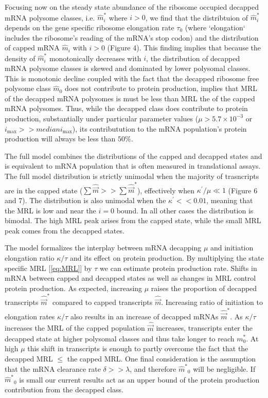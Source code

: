\documentclass[review]{elsarticle}
\newcommand{\imax}{\ensuremath{{i_{\max}}}\xspace}
\newcommand{\kappaprime}{\ensuremath{\kappa^{\prime}}\xspace}
\newcommand{\mhat}{\ensuremath{\hat{m}}\xspace}
\newcommand{\mhatstar}{\ensuremath{\mhat^{*}}\xspace}
\newcommand{\mvec}{\ensuremath{\vec{m}}\xspace}
\newcommand{\mvechat}{\ensuremath{\hat{\mvec}}\xspace}
\newcommand{\mvechatstar}{\ensuremath{\mvechat^*}\xspace}
\begin{document}
Focusing now on the steady state abundance of the ribosome occupied decapped mRNA polysome classes, i.e.  $\mhat_i^*$ where $i > 0$, we find that the distribtuion of $\mhat^*_i$  depends on the gene specific ribosome elongation rate $\tau_0$ (where `elongation`  includes the ribosome's reading of the mRNA's stop codon) and the distribution of capped mRNA $\mhat_i$ with $i > 0$ (Figure 4).
\label{item:protein_production} This finding implies that because the density of $\mhat^*_i$ monotonically decreases with $i$, the distribution of decapped mRNA polysome classes is skewed and dominated by lower polysomal classes.
  This is monotonic decline coupled with the fact that the decapped ribosome free polysome class $\mhat_0$ does not contribute to protein production, implies that MRL of the decapped mRNA polysomes is must be less than MRL the of the capped mRNA polysomes.
  Thus, while the decapped class does contribute to protein production, substantially under particular parameter values ($\mu> 5.7 \times 10^{-3}$ or $\imax >> median \imax$), its contributution to the mRNA population's protein production will always be less than  $50\%$.



The full model combines the distributions of the capped and decapped states and is equivalent to mRNA population that is often measured in translational assays.
The full model distribution is strictly unimodal when the majority of trasncripts are in the capped state ($\sum \mvechat >> \sum \mvechatstar$), effectively when $\kappaprime/\mu \ll 1$ (Figure 6 and 7).
The distribution is also unimodal when the $\kappaprime << 0.01$, meaning that the MRL is low and near the $i=0$ bound. 
In all other cases the distribution is bimodal. The high MRL peak arises from the capped state, while the small MRL peak comes from the decapped states. 

The model formalizes the interplay between mRNA decapping $\mu$ and initiation elongation ratio $\kappa/\tau$ and its effect on protein production.
By multiplying the state specific MRL [\ref{eq:MRL}] by $\tau$ we can estimate protein production rate.
Shifts in mRNA between capped and decapped states as well as changes in MRL control protein production.
As expected, increasing $\mu$ raises the proportion of decapped transcripts \mvechatstar compared to capped transcripts \mvechat.
Increasing ratio of initiation to elongation rates $\kappa/\tau$ also results in an increase of decapped mRNAs \mvechatstar.
As $\kappa/\tau$ increases the MRL of the capped population \mvechat increases, transcripts enter the decapped state at higher polysomal classes and thus take longer to reach $m_0^*$.
At high $\mu$ this shift in transcripts is enough to partly overcome the fact that the decapped MRL $\leq$ the capped MRL.
One final consideration is the assumption that the mRNA clearance rate $\delta >> \lambda$, and therefore $\mhatstar_0$ will be negligible. If $\mhatstar_0$ is small our current results act as an upper bound of the protein production contribution from the decapped class. 
\end{document}
